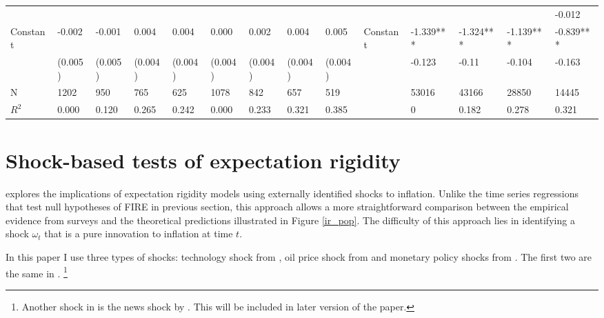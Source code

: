 \documentclass[]{article}
\begin{document}
\begin{table}
\begin{adjustbox}{width={24cm},totalheight={14cm},angle=90}
\begin{tabular}{llllllllllllll}
				&             &           &           &           &               &           &           &           &                      &               &           &           & -0.012    \\
				Constant               & -0.002      & -0.001    & 0.004     & 0.004     & 0.000         & 0.002     & 0.004     & 0.005     &   Constant                   & -1.339***     & -1.324*** & -1.139*** & -0.839*** \\
				& (0.005)     & (0.005)   & (0.004)   & (0.004)   & (0.004)       & (0.004)   & (0.004)   & (0.004)   &                      & -0.123        & -0.11     & -0.104    & -0.163    \\
				\hline 
				N                    & 1202        & 950       & 765       & 625       & 1078          & 842       & 657       & 519       &                      & 53016         & 43166     & 28850     & 14445     \\
				$R^2$ & 0.000       & 0.120     & 0.265     & 0.242     & 0.000         & 0.233     & 0.321     & 0.385     &                      & 0             & 0.182     & 0.278     & 0.321  \\
				\hline    
			\end{tabular}
		\end{adjustbox}
	\end{table}
	
	\section{Shock-based tests of expectation rigidity }\label{ShockBased}
	
	\citet{coibion2012can} explores the implications of expectation rigidity models using externally identified shocks to inflation.  Unlike the time series regressions that test null hypotheses of FIRE in previous section, this approach allows a more straightforward comparison between the empirical evidence from surveys and the theoretical predictions illustrated in Figure \ref{ir_pop}. The difficulty of this approach lies in identifying a shock $\omega_t$ that is a pure innovation to inflation at time $t$. 
	
	In this paper I use three types of shocks: technology shock from \citet{gali1999technology}, oil price shock from \citet{hamilton1996happened} and monetary policy shocks from  \citet{laseen2011anticipated}. The first two are the same in \citet{coibion2012can}. \footnote{ Another shock in \citet{coibon2012can} is the news shock by \citet{barsky2011news}. This will be included in later version of the paper.} 
	
\end{document}
